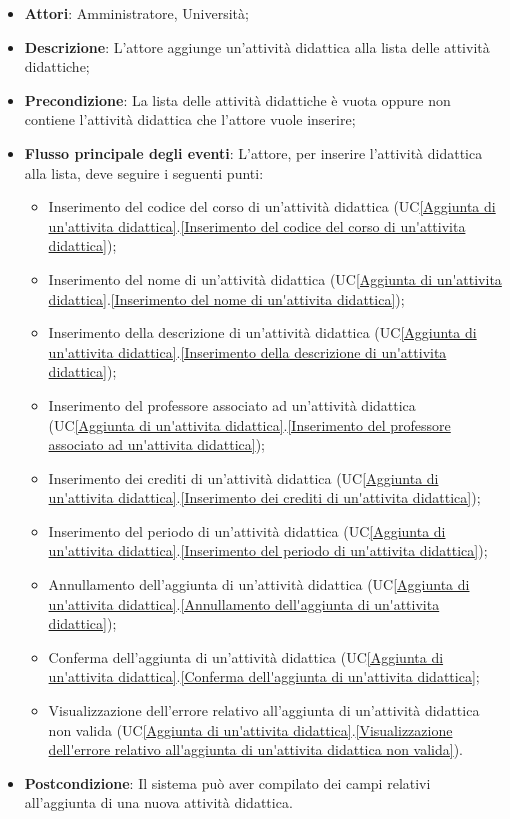 \begin{itemize}
	\item \textbf{Attori}: Amministratore, Università;
	\item \textbf{Descrizione}: L'attore aggiunge un'attività didattica alla lista delle attività didattiche;
	
	\item \textbf{Precondizione}: La lista delle attività didattiche è vuota oppure non contiene l'attività didattica che l'attore vuole inserire;
	
	\item \textbf{Flusso principale degli eventi}: L'attore, per inserire l'attività didattica alla lista, deve seguire i seguenti punti:
	\begin{itemize}
		\item Inserimento del codice del corso di un'attività didattica (UC\ref{Aggiunta di un'attivita didattica}.\ref{Inserimento del codice del corso di un'attivita didattica});
		\item Inserimento del nome di un'attività didattica (UC\ref{Aggiunta di un'attivita didattica}.\ref{Inserimento del nome di un'attivita didattica});
		\item Inserimento della descrizione di un'attività didattica (UC\ref{Aggiunta di un'attivita didattica}.\ref{Inserimento della descrizione di un'attivita didattica});
		\item Inserimento del professore associato ad un'attività didattica (UC\ref{Aggiunta di un'attivita didattica}.\ref{Inserimento del professore associato ad un'attivita didattica});
		\item Inserimento dei crediti di un'attività didattica (UC\ref{Aggiunta di un'attivita didattica}.\ref{Inserimento dei crediti di un'attivita didattica});
		\item Inserimento del periodo di un'attività didattica (UC\ref{Aggiunta di un'attivita didattica}.\ref{Inserimento del periodo di un'attivita didattica});
		\item Annullamento dell'aggiunta di un'attività didattica (UC\ref{Aggiunta di un'attivita didattica}.\ref{Annullamento dell'aggiunta di un'attivita didattica});
		\item Conferma dell'aggiunta di un'attività didattica (UC\ref{Aggiunta di un'attivita didattica}.\ref{Conferma dell'aggiunta di un'attivita didattica};
		\item Visualizzazione dell'errore relativo all'aggiunta di un'attività didattica non valida (UC\ref{Aggiunta di un'attivita didattica}.\ref{Visualizzazione dell'errore relativo all'aggiunta di un'attivita didattica non valida}).
	\end{itemize}
	\item \textbf{Postcondizione}: Il sistema può aver compilato dei campi relativi all'aggiunta di una nuova attività didattica.
	
\end{itemize}

